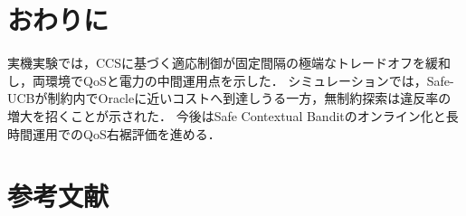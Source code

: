 \documentclass[a4paper,10pt,twocolumn]{ltjsarticle}
\begin{document}
\section{おわりに}
実機実験では，CCSに基づく適応制御が固定間隔の極端なトレードオフを緩和し，両環境でQoSと電力の中間運用点を示した．
シミュレーションでは，Safe-UCBが制約内でOracleに近いコストへ到達しうる一方，無制約探索は違反率の増大を招くことが示された．
今後はSafe Contextual Banditのオンライン化と長時間運用でのQoS右裾評価を進める．

\vspace{-2mm}
\section*{参考文献}
\vspace{-1mm}
\printbibliography[heading=none]
\end{document}
